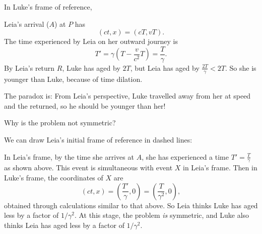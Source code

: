 \documentclass[a4paper]{article}
\begin{document}
In Luke's frame of reference,
\begin{center}
\end{center}
Leia's arrival ($A$) at $P$ has
\[
  (ct, x) = (cT, vT).
\]
The time experienced by Leia on her outward journey is
\[
  T' = \gamma\left(T - \frac{v}{c^2}T\right) = \frac{T}{\gamma}.
\]
By Leia's return $R$, Luke has aged by $2T$, but Leia has aged by $\frac{2T}{\gamma} < 2T$. So she is younger than Luke, because of time dilation.

The paradox is: From Leia's perspective, Luke travelled away from her at speed and the returned, so he should be younger than her!

Why is the problem not symmetric?

We can draw Leia's initial frame of reference in dashed lines:
\begin{center}
\end{center}

In Leia's frame, by the time she arrives at $A$, she has experienced a time $T' = \frac{T}{\gamma}$ as shown above. This event is simultaneous with event $X$ in Leia's frame. Then in Luke's frame, the coordinates of $X$ are
\[
  (ct, x) = \left(\frac{T'}{\gamma}, 0\right) = \left(\frac{T}{\gamma^2}, 0\right),
\]
obtained through calculations similar to that above. So Leia thinks Luke has aged less by a factor of $1/\gamma^2$. At this stage, the problem \emph{is} symmetric, and Luke also thinks Leia has aged less by a factor of $1/\gamma^2$.
\end{document}
